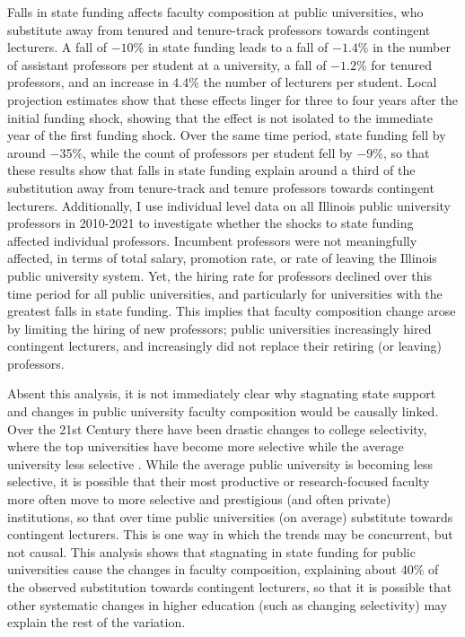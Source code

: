 Falls in state funding affects faculty composition at public universities, who substitute away from tenured and tenure-track professors towards contingent lecturers.
A fall of $-10$\% in state funding leads to a fall of $-1.4$\% in the number of assistant professors per student at a university, a fall of $-1.2$\% for tenured professors, and an increase in 4.4\% the number of lecturers per student.
Local projection estimates show that these effects linger for three to four years after the initial funding shock, showing that the effect is not isolated to the immediate year of the first funding shock. 
Over the same time period, state funding fell by around $-$35\%, while the count of professors per student fell by $-$9\%, so that these results show that falls in state funding explain around a third of the substitution away from tenure-track and tenure professors towards contingent lecturers.
Additionally, I use individual level data on all Illinois public university professors in 2010-2021 to investigate whether the shocks to state funding affected individual professors.
Incumbent professors were not meaningfully affected, in terms of total salary, promotion rate, or rate of leaving the Illinois public university system.
Yet, the hiring rate for professors declined over this time period for all public universities, and particularly for universities with the greatest falls in state funding.
This implies that faculty composition change arose by limiting the hiring of new professors; public universities increasingly hired contingent lecturers, and increasingly did not replace their retiring (or leaving) professors.

Absent this analysis, it is not immediately clear why stagnating state support and changes in public university faculty composition would be causally linked.
Over the 21st Century there have been drastic changes to college selectivity, where the top universities have become more selective while the average university less selective \citep{hoxby2009changing}.
While the average public university is becoming less selective, it is possible that their most productive or research-focused faculty more often move to more selective and prestigious (and often private) institutions, so that over time public universities (on average) substitute towards contingent lecturers. 
This is one way in which the trends may be concurrent, but not causal.
This analysis shows that stagnating in state funding for public universities cause the changes in faculty composition, explaining about 40\% of the observed substitution towards contingent lecturers, so that it is possible that other systematic changes in higher education (such as changing selectivity) may explain the rest of the variation.

